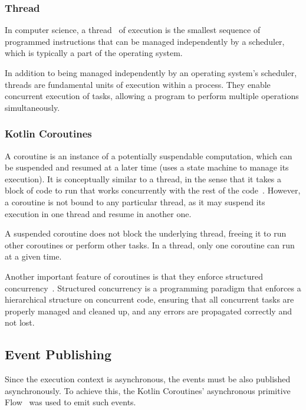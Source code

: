 \subsubsection{Thread}\label{subsubsec:thread}

In computer science, a thread~\cite{java-thread} of execution is the smallest sequence of programmed instructions that can be managed independently by a scheduler, which is typically a part of the operating system.

In addition to being managed independently by an operating system's scheduler, threads are fundamental units of execution within a process.
They enable concurrent execution of tasks, allowing a program to perform multiple operations simultaneously.

\subsubsection{Kotlin Coroutines}\label{subsubsec:kotlin-coroutines}

A coroutine is an instance of a potentially suspendable computation,
which can be suspended and resumed at a later time (uses a state machine to manage its execution).
It is conceptually similar to a thread,
in the sense that it takes a block of code
to run that works concurrently with the rest of the code~\cite{kotlin-coroutines}.
However, a coroutine is not bound to any particular thread,
as it may suspend its execution in one thread and resume in another one.

A suspended coroutine does not block the underlying thread, freeing it to run other coroutines or perform other tasks.
In a thread, only one coroutine can run at a given time.

Another important feature of coroutines is that they enforce structured concurrency~\cite{kotlin-coroutines}.
Structured concurrency is a programming paradigm that enforces a hierarchical structure on concurrent code, ensuring that all concurrent tasks are properly managed and cleaned up, and any errors are propagated correctly and not lost.

\subsection{Event Publishing}\label{subsec:event-publishing}

Since the execution context is asynchronous, the events must be also published asynchronously.
To achieve this, the Kotlin Coroutines' asynchronous primitive Flow~\cite{kotlin-flow} was used to emit such events.

